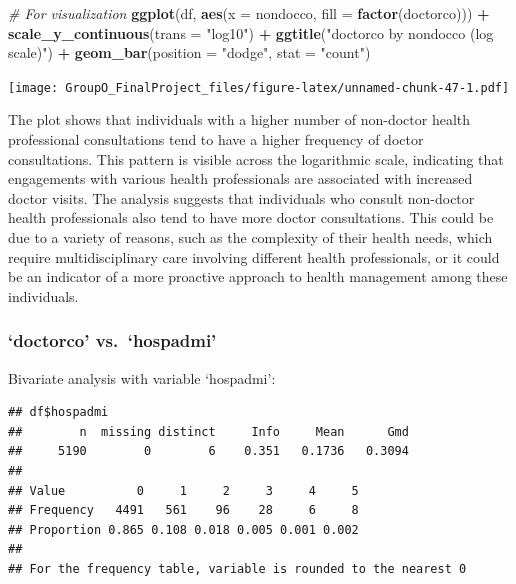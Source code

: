 \documentclass[
]{article}
\newenvironment{Shaded}{\begin{snugshade}}{\end{snugshade}}
\newcommand{\AttributeTok}[1]{\textcolor[rgb]{0.13,0.29,0.53}{#1}}
\newcommand{\CommentTok}[1]{\textcolor[rgb]{0.56,0.35,0.01}{\textit{#1}}}
\newcommand{\FunctionTok}[1]{\textcolor[rgb]{0.13,0.29,0.53}{\textbf{#1}}}
\newcommand{\NormalTok}[1]{#1}
\newcommand{\SpecialCharTok}[1]{\textcolor[rgb]{0.81,0.36,0.00}{\textbf{#1}}}
\newcommand{\StringTok}[1]{\textcolor[rgb]{0.31,0.60,0.02}{#1}}
\begin{document}
\begin{Shaded}
\begin{Highlighting}[]
\CommentTok{\# For visualization}
\FunctionTok{ggplot}\NormalTok{(df, }\FunctionTok{aes}\NormalTok{(}\AttributeTok{x =}\NormalTok{ nondocco, }\AttributeTok{fill =} \FunctionTok{factor}\NormalTok{(doctorco))) }\SpecialCharTok{+} 
  \FunctionTok{scale\_y\_continuous}\NormalTok{(}\AttributeTok{trans =} \StringTok{"log10"}\NormalTok{) }\SpecialCharTok{+}
  \FunctionTok{ggtitle}\NormalTok{(}\StringTok{"\textquotesingle{}doctorco\textquotesingle{} by \textquotesingle{}nondocco\textquotesingle{} (log scale)"}\NormalTok{) }\SpecialCharTok{+}
  \FunctionTok{geom\_bar}\NormalTok{(}\AttributeTok{position =} \StringTok{"dodge"}\NormalTok{, }\AttributeTok{stat =} \StringTok{"count"}\NormalTok{)}
\end{Highlighting}
\end{Shaded}

\texttt{[image: GroupO\_FinalProject\_files/figure-latex/unnamed-chunk-47-1.pdf]}

The plot shows that individuals with a higher number of non-doctor
health professional consultations tend to have a higher frequency of
doctor consultations. This pattern is visible across the logarithmic
scale, indicating that engagements with various health professionals are
associated with increased doctor visits. The analysis suggests that
individuals who consult non-doctor health professionals also tend to
have more doctor consultations. This could be due to a variety of
reasons, such as the complexity of their health needs, which require
multidisciplinary care involving different health professionals, or it
could be an indicator of a more proactive approach to health management
among these individuals.

\subsubsection{`doctorco' vs.~`hospadmi'}\label{doctorco-vs.-hospadmi}

Bivariate analysis with variable `hospadmi':

\begin{Shaded}
\end{Shaded}

\begin{verbatim}
## df$hospadmi 
##        n  missing distinct     Info     Mean      Gmd 
##     5190        0        6    0.351   0.1736   0.3094 
##                                               
## Value          0     1     2     3     4     5
## Frequency   4491   561    96    28     6     8
## Proportion 0.865 0.108 0.018 0.005 0.001 0.002
## 
## For the frequency table, variable is rounded to the nearest 0
\end{verbatim}
\end{document}
